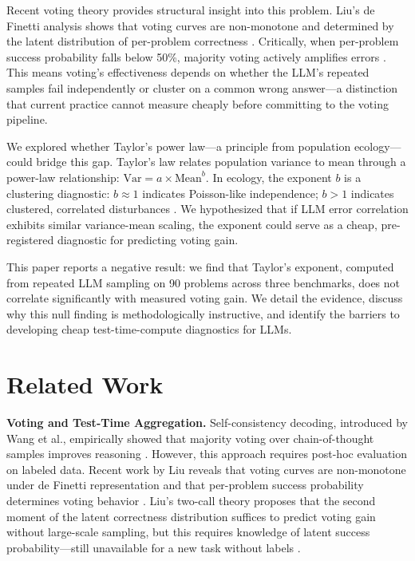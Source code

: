 \documentclass[11pt,letterpaper]{article}
\begin{document}
Recent voting theory provides structural insight into this problem. Liu's de Finetti analysis shows that voting curves are non-monotone and determined by the latent distribution of per-problem correctness \citep{Liu2026voting}. Critically, when per-problem success probability falls below 50\%, majority voting actively amplifies errors \citep{Liu2026voting}. This means voting's effectiveness depends on whether the LLM's repeated samples fail independently or cluster on a common wrong answer---a distinction that current practice cannot measure cheaply before committing to the voting pipeline.

We explored whether Taylor's power law---a principle from population ecology---could bridge this gap. Taylor's law relates population variance to mean through a power-law relationship: $\text{Var} = a \times \text{Mean}^b$. In ecology, the exponent $b$ is a clustering diagnostic: $b \approx 1$ indicates Poisson-like independence; $b > 1$ indicates clustered, correlated disturbances \citep{Taylor1961}. We hypothesized that if LLM error correlation exhibits similar variance-mean scaling, the exponent could serve as a cheap, pre-registered diagnostic for predicting voting gain.

This paper reports a negative result: we find that Taylor's exponent, computed from repeated LLM sampling on 90 problems across three benchmarks, does not correlate significantly with measured voting gain. We detail the evidence, discuss why this null finding is methodologically instructive, and identify the barriers to developing cheap test-time-compute diagnostics for LLMs.

\section{Related Work}

\textbf{Voting and Test-Time Aggregation.} Self-consistency decoding, introduced by Wang et al., empirically showed that majority voting over chain-of-thought samples improves reasoning \citep{Wang2022}. However, this approach requires post-hoc evaluation on labeled data. Recent work by Liu reveals that voting curves are non-monotone under de Finetti representation and that per-problem success probability determines voting behavior \citep{Liu2026voting}. Liu's two-call theory proposes that the second moment of the latent correctness distribution suffices to predict voting gain without large-scale sampling, but this requires knowledge of latent success probability---still unavailable for a new task without labels \citep{Liu2026moments}.
\end{document}
